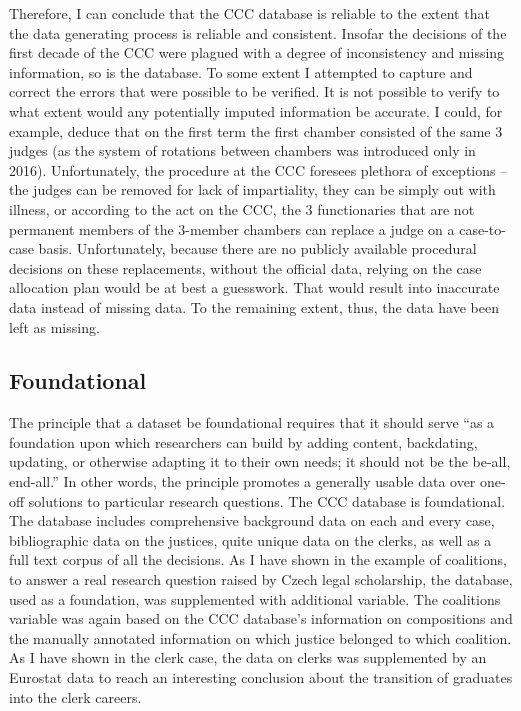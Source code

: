 \documentclass[
  11pt,
]{article}
\begin{document}
Therefore, I can conclude that the CCC database is reliable to the extent that the data generating process is reliable and consistent. Insofar the decisions of the first decade of the CCC were plagued with a degree of inconsistency and missing information, so is the database. To some extent I attempted to capture and correct the errors that were possible to be verified. It is not possible to verify to what extent would any potentially imputed information be accurate. I could, for example, deduce that on the first term the first chamber consisted of the same 3 judges (as the system of rotations between chambers was introduced only in 2016). Unfortunately, the procedure at the CCC foresees plethora of exceptions -- the judges can be removed for lack of impartiality, they can be simply out with illness, or according to the act on the CCC, the 3 functionaries that are not permanent members of the 3-member chambers can replace a judge on a case-to-case basis. Unfortunately, because there are no publicly available procedural decisions on these replacements, without the official data, relying on the case allocation plan would be at best a guesswork. That would result into inaccurate data instead of missing data. To the remaining extent, thus, the data have been left as missing.

\subsection{Foundational}\label{foundational}

The principle that a dataset be foundational requires that it should serve ``as a foundation upon which researchers can build by adding content, backdating, updating, or otherwise adapting it to their own needs; it should not be the be-all, end-all.'' In other words, the principle promotes a generally usable data over one-off solutions to particular research questions. The CCC database is foundational. The database includes comprehensive background data on each and every case, bibliographic data on the justices, quite unique data on the clerks, as well as a full text corpus of all the decisions. As I have shown in the example of coalitions, to answer a real research question raised by Czech legal scholarship, the database, used as a foundation, was supplemented with additional variable. The coalitions variable was again based on the CCC database's information on compositions and the manually annotated information on which justice belonged to which coalition. As I have shown in the clerk case, the data on clerks was supplemented by an Eurostat data to reach an interesting conclusion about the transition of graduates into the clerk careers.
\end{document}
